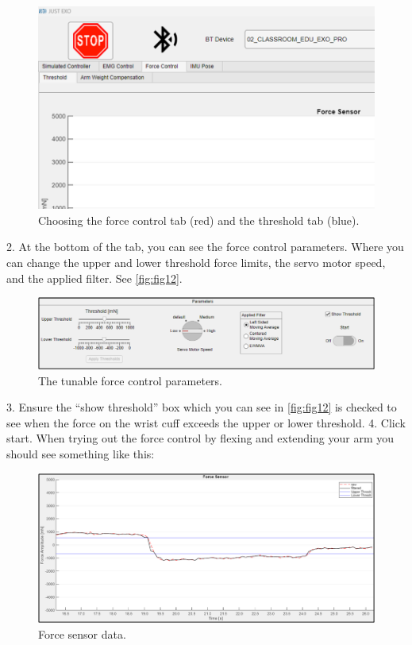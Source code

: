 \begin{figure}[H]
	\centering
	\includegraphics[width=0.7\linewidth]{img/fig_11}
	\caption{Choosing the force control tab (red) and the threshold tab (blue).}
	\label{fig:fig11}
\end{figure}



2.	At the bottom of the tab, you can see the force control parameters. Where you can change the upper and lower threshold force limits, the servo motor speed, and the applied filter. See \autoref{fig:fig12}.

\begin{figure}[H]
	\centering
	\includegraphics[width=0.7\linewidth]{img/fig_12}
	\caption{The tunable force control parameters.}
	\label{fig:fig12}
\end{figure}

3.	Ensure the “show threshold” box which you can see in \autoref{fig:fig12} is checked to see when the force on the wrist cuff exceeds the upper or lower threshold. 
4.	Click start. When trying out the force control by flexing and extending your arm you should see something like this:
 

\begin{figure}[H]
	\centering
	\includegraphics[width=0.7\linewidth]{img/fig_13}
	\caption{Force sensor data.}
	\label{fig:fig13}
\end{figure}

